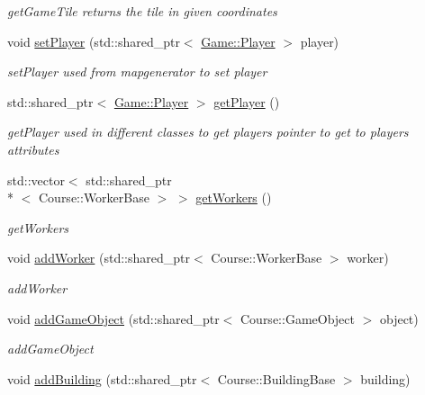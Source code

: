 \begin{DoxyCompactItemize}
\begin{DoxyCompactList}\small\item\em get\-Game\-Tile returns the tile in given coordinates \end{DoxyCompactList}\item 
void \hyperlink{class_game_1_1_game_object_manager_a2a3c2db760d5dae0eca50ba1336d111a}{set\-Player} (std\-::shared\-\_\-ptr$<$ \hyperlink{class_game_1_1_player}{Game\-::\-Player} $>$ player)
\begin{DoxyCompactList}\small\item\em set\-Player used from mapgenerator to set player \end{DoxyCompactList}\item 
std\-::shared\-\_\-ptr$<$ \hyperlink{class_game_1_1_player}{Game\-::\-Player} $>$ \hyperlink{class_game_1_1_game_object_manager_a324505448a478a74a4485c7517f2af8d}{get\-Player} ()
\begin{DoxyCompactList}\small\item\em get\-Player used in different classes to get players pointer to get to players attributes \end{DoxyCompactList}\item 
std\-::vector$<$ std\-::shared\-\_\-ptr\\*
$<$ Course\-::\-Worker\-Base $>$ $>$ \hyperlink{class_game_1_1_game_object_manager_a15bafc071007133e9a4c971050b72506}{get\-Workers} ()
\begin{DoxyCompactList}\small\item\em get\-Workers \end{DoxyCompactList}\item 
void \hyperlink{class_game_1_1_game_object_manager_ab5dc0d2150e7df5821b974b12ee4cf54}{add\-Worker} (std\-::shared\-\_\-ptr$<$ Course\-::\-Worker\-Base $>$ worker)
\begin{DoxyCompactList}\small\item\em add\-Worker \end{DoxyCompactList}\item 
void \hyperlink{class_game_1_1_game_object_manager_ae0e1788a3b1b9edf64cda2a259201832}{add\-Game\-Object} (std\-::shared\-\_\-ptr$<$ Course\-::\-Game\-Object $>$ object)
\begin{DoxyCompactList}\small\item\em add\-Game\-Object \end{DoxyCompactList}\item 
void \hyperlink{class_game_1_1_game_object_manager_a0515eff15f2bf07611c2192cf1283fbe}{add\-Building} (std\-::shared\-\_\-ptr$<$ Course\-::\-Building\-Base $>$ building)

\end{DoxyCompactItemize}
